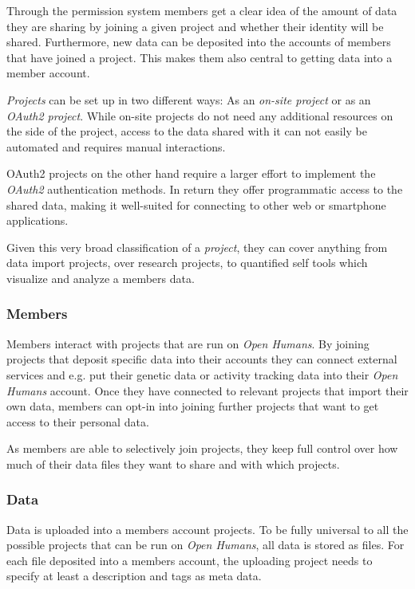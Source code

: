 \documentclass[a4paper,num-refs]{oup-contemporary}
\begin{document}
Through the permission system members get a clear idea of the amount of data they are sharing by joining a given project and whether their identity will be shared. Furthermore, new data can be deposited into the accounts of members that have joined a project. This makes them also central to getting data into a member account.

\textit{Projects} can be set up in two different ways: As an \textit{on-site project} or as an \textit{OAuth2 project}. While on-site projects do not need any additional resources on the side of the project, access to the data shared with it can not easily be automated and requires manual interactions.

OAuth2 projects on the other hand require a larger effort to implement the \textit{OAuth2} authentication methods. In return they offer programmatic access to the shared data, making it well-suited for connecting to other web or smartphone applications.

Given this very broad classification of a \textit{project}, they can cover anything from data import projects, over research projects, to quantified self tools which visualize and analyze a members data. 

\subsubsection{Members}
Members interact with projects that are run on \textit{Open Humans}. By joining projects that deposit specific data into their accounts they can connect external services and e.g. put their genetic data or activity tracking data into their \textit{Open Humans} account. Once they have connected to relevant projects that import their own data, members can opt-in into joining further projects that want to get access to their personal data.

As members are able to selectively join projects, they keep full control over how much of their data files they want to share and with which projects. 

\subsubsection{Data}
Data is uploaded into a members account projects. To be fully universal to all the possible projects that can be run on \textit{Open Humans}, all data is stored as files. For each file deposited into a members account, the uploading project needs to specify at least a description and tags as meta data. 
\end{document}
